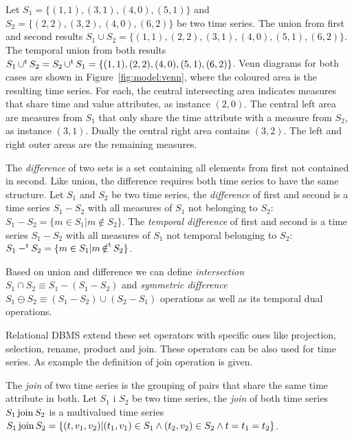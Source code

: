 \begin{example}\label{ex:model:s1s2}
  Let $S_1=\{(1,1),(3,1),(4,0),(5,1)\}$ and $S_2 = \allowbreak
  \{\allowbreak (2,\allowbreak 2),\allowbreak (3,2),(4,0),(6,2)\}$ be
  two time series. The union from first and second results $S_1 \cup
  S_2 = \{(1,1),\allowbreak (2,2),\allowbreak (3,1),\allowbreak (4,
  0),\allowbreak (5,1),\allowbreak (6,2)\}$. The temporal union from
  both results $S_1 \operatorname*{\cup^t} S_2 = S_2 \operatorname*{\cup^t} S_1 =
  \{(1,1),(2,2),(4,0),(5,1),\allowbreak (6,2)\}$. %
  Venn diagrams for both cases are shown in
  Figure~\ref{fig:model:venn}, where the coloured area is the
  resulting time series. For each, the central intersecting area
  indicates measures that share time and value attributes, as instance
  $(2,0)$. The central left area are measures from $S_1$ that only
  share the time attribute with a measure from $S_2$, as instance
  $(3,1)$. Dually the central right area contains $(3,2)$. The left
  and right outer areas are the remaining measures.
 \end{example}




The \emph{difference} of two sets is a set containing all elements
from first not contained in second. Like union, the difference
requires both time series to have the same structure. %
Let $S_1$ and $S_2$ be two time series, the \emph{difference} of first
and second is a time series $S_1 - S_2$ with all measures of $S_1$ not
belonging to $S_2$: $S_1 - S_2 = \{ m \in S_1 | m \notin S_2
\}$. The \emph{temporal difference} of first and second is a time
series $S_1 - S_2$ with all measures of $S_1$ not temporal belonging
to $S_2$: $S_1 -^t S_2 = \{ m \in S_1 | m \operatorname*{\notin^t} S_2 \}$.


Based on union and difference we can define \emph{intersection} $S_1\cap
S_2 \equiv S_1 - (S_1 - S_2)$ and \emph{symmetric difference} $S_1 \ominus
S_2 \equiv (S_1 - S_2) \cup (S_2 - S_1)$ operations as well as its
temporal dual operations.


Relational DBMS extend these set operators with specific ones like
projection, selection, rename, product and join. These operators can
be also used for time series. As example the definition of join
operation is given.


The \emph{join} of two time series is the grouping of pairs that share
the same time attribute in both.  Let $S_1$ i $S_2$ be two time series,
the \emph{join} of both time series $S_1 \operatorname*{join} S_2$ is a multivalued
time series $S_1 \operatorname*{join} S_2 = \{ (t,v_1,v_2) | (t_1,v_1) \in S_1 \wedge
(t_2,v_2) \in S_2 \wedge t=t_1=t_2 \}$.


